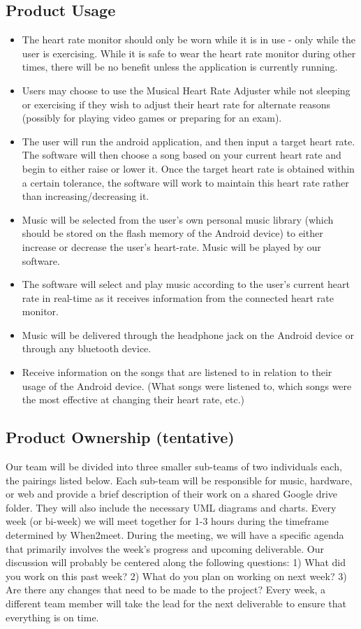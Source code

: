 \documentclass[letterpaper,english, 12pt]{scrreprt}
\begin{document}
\subsection{Product Usage}
\begin{itemize}
	\item The heart rate monitor should only be worn while it is in use - only while the user is exercising. While it is safe to wear the heart rate monitor during other times, there will be no benefit unless the application is currently running. 
	\item Users may choose to use the Musical Heart Rate Adjuster while not sleeping or exercising if they wish to adjust their heart rate for alternate reasons (possibly for playing video games or preparing for an exam). 
	\item The user will run the android application, and then input a target heart rate. The software will then choose a song based on your current heart rate and begin to either raise or lower it. Once the target heart rate is obtained within a certain tolerance, the software will work to maintain this heart rate rather than increasing/decreasing it.
	\item Music will be selected from the user's own personal music library (which should be stored on the flash memory of the Android device) to either increase or decrease the user's heart-rate. Music will be played by our software.
	\item The software will select and play music according to the user's current heart rate in real-time as it receives information from the connected heart rate monitor.
	\item Music will be delivered through the headphone jack on the Android device or through any bluetooth device.
	\item Receive information on the songs that are listened to in relation to their usage of the Android device. (What songs were listened to, which songs were the most effective at changing their heart rate, etc.)
\end{itemize}

\subsection{Product Ownership (tentative)}
Our team will be divided into three smaller sub-teams of two individuals each, the pairings listed below. Each sub-team will be responsible for music, hardware, or web and provide a brief description of their work on a shared Google drive folder. They will also include the necessary UML diagrams and charts. Every week (or bi-week) we will meet together for 1-3 hours during the timeframe determined by When2meet. During the meeting, we will have a specific agenda that primarily involves the week's progress and upcoming deliverable. Our discussion will probably be centered along the following questions: 1) What did you work on this past week? 2) What do you plan on working on next week? 3) Are there any changes that need to be made to the project? Every week, a different team member will take the lead for the next deliverable to ensure that everything is on time.\\
\end{document}
